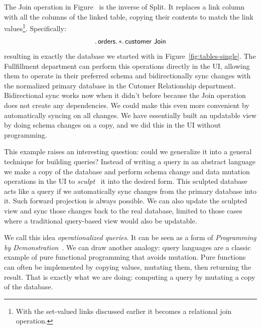 \documentclass[english,submission]{programming}
\theoremstyle{definition}
\begin{document}
The \textsf{Join} operation in Figure~%
is the inverse of \textsf{Split}. It replaces a link column with all the columns of the linked table, copying their contents to match the link values\footnote{With the set-valued links discussed earlier it becomes a relational join operation.}. Specifically:
\[
\ldotp \textsf{orders}\ldotp * \ldotp \textsf{customer Join} \\
\]
resulting in exactly the database we started with in Figure~\ref{fig:tables-single}.
The Fullfillment department can perform this operations directly in the UI, allowing them
to operate in their preferred schema and bidirectionally sync changes with the normalized primary database in the Cutomer Relationship department. Bidirectional sync works now when it didn't before because the \textsf{Join} operation does not create any dependencies. We could make this even more convenient by automatically syncing on all changes. We have essentially built an updatable view by doing schema changes on a copy, and we did this in the UI without programming.

This example raises an interesting question: could we generalize it into a general technique for building queries? Instead of writing a query in an abstract language we make a copy of the database and perform schema change and data mutation operations in the UI to \textit{sculpt}~\cite{sculpin} it into the desired form. This sculpted database acts like a query if we automatically sync changes from the primary database into it. Such forward projection is always possible. We can also update the sculpted view and sync those changes back to the real database, limited to those cases where a traditional query-based view would also be updatable.

We call this idea \textit{operationalized queries}. It can be seen as a form of \textit{Programming by Demonstration}~\cite{cypher93-pbd}. We can draw another analogy: query languages are a classic example of pure functional programming that avoids mutation. Pure functions can often be implemented by copying values, mutating them, then returning the result. That is exactly what we are
doing: computing a query by mutating a copy of the database.
\end{document}
